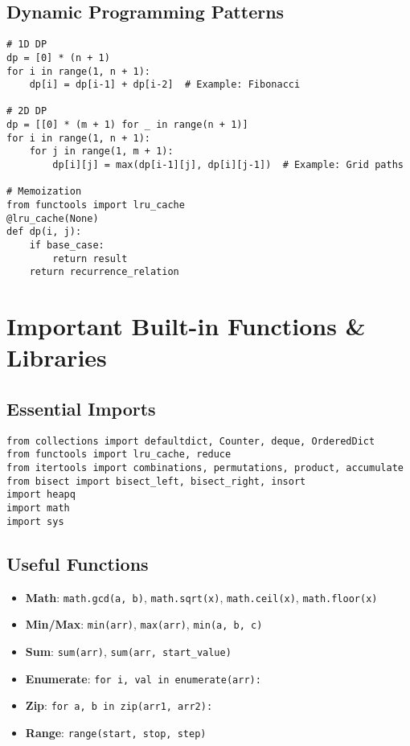 \subsection{Dynamic Programming Patterns}
\begin{verbatim}
# 1D DP
dp = [0] * (n + 1)
for i in range(1, n + 1):
    dp[i] = dp[i-1] + dp[i-2]  # Example: Fibonacci

# 2D DP
dp = [[0] * (m + 1) for _ in range(n + 1)]
for i in range(1, n + 1):
    for j in range(1, m + 1):
        dp[i][j] = max(dp[i-1][j], dp[i][j-1])  # Example: Grid paths

# Memoization
from functools import lru_cache
@lru_cache(None)
def dp(i, j):
    if base_case:
        return result
    return recurrence_relation
\end{verbatim}

\section{Important Built-in Functions \& Libraries}

\subsection{Essential Imports}
\begin{verbatim}
from collections import defaultdict, Counter, deque, OrderedDict
from functools import lru_cache, reduce
from itertools import combinations, permutations, product, accumulate
from bisect import bisect_left, bisect_right, insort
import heapq
import math
import sys
\end{verbatim}

\subsection{Useful Functions}
\begin{itemize}
    \item \textbf{Math}: \texttt{math.gcd(a, b)}, \texttt{math.sqrt(x)}, \texttt{math.ceil(x)}, \texttt{math.floor(x)}
    \item \textbf{Min/Max}: \texttt{min(arr)}, \texttt{max(arr)}, \texttt{min(a, b, c)}
    \item \textbf{Sum}: \texttt{sum(arr)}, \texttt{sum(arr, start\_value)}
    \item \textbf{Enumerate}: \texttt{for i, val in enumerate(arr):}
    \item \textbf{Zip}: \texttt{for a, b in zip(arr1, arr2):}
    \item \textbf{Range}: \texttt{range(start, stop, step)}
\end{itemize}

